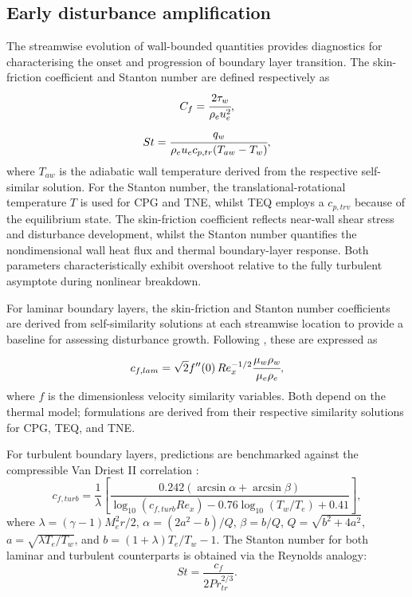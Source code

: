 \subsection{Early disturbance amplification}
The streamwise evolution of wall-bounded quantities provides diagnostics for characterising the onset and progression of boundary layer transition. The skin-friction coefficient and Stanton number are defined respectively as
\begin{equation}
    C_f = \cfrac{2\tau_w}{\rho_e u_e^2},
\end{equation}
\begin{equation}
    St = \cfrac{q_w}{\rho_e u_e c_{p,tr} (T_{aw}-T_w)},
\end{equation}
where $T_{aw}$ is the adiabatic wall temperature derived from the respective self-similar solution. For the Stanton number, the translational-rotational temperature $T$ is used for \gls{CPG} and \gls{TNE}, whilst \gls{TEQ} employs a $c_{p,trv}$ because of the equilibrium state. The skin-friction coefficient reflects near-wall shear stress and disturbance development, whilst the Stanton number quantifies the nondimensional wall heat flux and thermal boundary-layer response. Both parameters characteristically exhibit overshoot relative to the fully turbulent asymptote during nonlinear breakdown.

For laminar boundary layers, the skin-friction and Stanton number coefficients are derived from self-similarity solutions at each streamwise location to provide a baseline for assessing disturbance growth. Following \citet{White2005}, these are expressed as
\begin{equation}
c_{f,lam} = \sqrt{2} f''(0) \,Re_x^{-1/2}\cfrac{\mu_w \rho_w}{\mu_e \rho_e},
\end{equation}
where $f$ is the dimensionless velocity similarity variables. Both depend on the thermal model; formulations are derived from their respective similarity solutions for \gls{CPG}, \gls{TEQ}, and \gls{TNE}.

For turbulent boundary layers, predictions are benchmarked against the compressible Van Driest II correlation \citep{VanDriest1952,Sandhametal2014}:
\begin{equation}
    c_{f,turb} = \frac{1}{\lambda} \left[ \frac{0.242 \left( \arcsin\alpha + \arcsin\beta \right)}{\log_{10}(c_{f,turb}  Re_x) - 0.76 \log_{10}(T_w/T_e) + 0.41} \right],
\end{equation}
where $\lambda = (\gamma - 1) M_e^2 r/2$, $\alpha = (2a^2 - b)/Q$, $\beta = b/Q$, $Q = \sqrt{b^2 + 4a^2}$, $a = \sqrt{\lambda T_e/T_w}$, and $b = (1+\lambda)T_e/T_w - 1$. The Stanton number for both laminar and turbulent counterparts is obtained via the Reynolds analogy:
\begin{equation}
St = \frac{c_f}{2Pr_{tr}^{2/3}}.
\end{equation}

